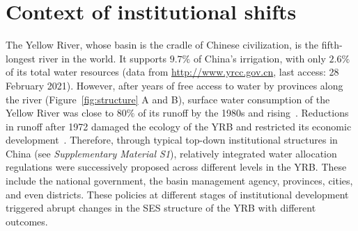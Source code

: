 \documentclass{nsr}
\begin{document}
\section{Context of institutional shifts}\label{institution}
The Yellow River, whose basin is the cradle of Chinese civilization, is the fifth-longest river in the world. It supports $9.7\%$ of China’s irrigation, with only $2.6\%$ of its total water resources (data from \href{http://www.yrcc.gov.cn}{http://www.yrcc.gov.cn}, last access: 28 February 2021).
However, after years of free access to water by provinces along the river (Figure~\ref{fig:structure} A and B), surface water consumption of the Yellow River was close to $80\%$ of its runoff by the 1980s and rising~\cite{wangYellowRiverwater2019,songSedimenttransportincreasing2020}.
Reductions in runoff after 1972 damaged the ecology of the YRB and restricted its economic development~\cite{wangYellowRiverwater2019}.
Therefore, through typical top-down institutional structures in China (see \textit{Supplementary Material S1}), relatively integrated water allocation regulations were successively proposed across different levels in the YRB.
These include the national government, the basin management agency, provinces, cities, and even districts.
These policies at different stages of institutional development triggered abrupt changes in the SES structure of the YRB with different outcomes.
\end{document}
